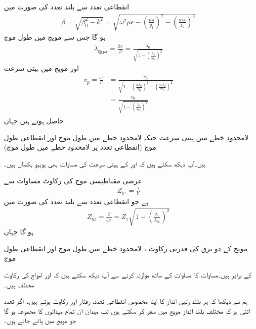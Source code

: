 انقطاعی تعدد سے بلند تعدد  کی صورت میں
\begin{align}
\beta=\sqrt{\beta_0^2-k^2}=\sqrt{\omega^2 \mu \epsilon-\left(\frac{n\pi}{y_1}\right)^2-\left(\frac{m\pi}{z_1}\right)^2}
\end{align}
ہو گا جس سے مویج میں طول موج
\begin{align}
\lambda_{\text{مویج}}=\frac{2\pi}{\beta}=\frac{\lambda_0}{\sqrt{1-\left(\frac{\lambda_0}{\lambda_{0c}}\right)^2}}
\end{align}
اور مویج میں  ہیتی سرعت
\begin{gather}
\begin{aligned}
v_p=\frac{\omega}{\beta}&=\frac{v_0}{\sqrt{1-\left(\frac{n\lambda_0}{2y_1}\right)^2-\left(\frac{m\lambda_0}{2z_1}\right)^2}}\\
&=\frac{v_0}{\sqrt{1-\left(\frac{\lambda_0}{\lambda_{0c}}\right)^2}}
\end{aligned}
\end{gather}
حاصل ہوتے ہیں جہاں
\begin{description}
 لامحدود خطے میں ہیتی سرعت  جبکہ 
 لامحدود خطے میں طول موج اور
 انقطاعی طول موج (انقطاعی تعدد پر لامحدود خطے میں طول موج)
\end{description}
ہیں۔آپ دیکھ سکتے ہیں کہ  اور  کے ہیتی سرعت کی مساوات بھی ہوبہو یکساں ہیں۔

عرضی مقناطیسی موج کی رکاوٹ مساوات  سے 
\begin{align*}
Z_{yz}=\frac{\gamma}{Y}
\end{align*}
ہے جو انقطاعی تعدد سے بلند تعدد  کی صورت میں
\begin{align}\label{مساوات_مویج_عرضی_مقناطیسی_رکاوٹ_حتمی}
Z_{yz}=\frac{\beta}{\omega \epsilon}=Z_z \sqrt{1-\left(\frac{\lambda_0}{\lambda_{0c}}\right)^2}
\end{align}
ہو گا جہاں
\begin{description}
 مویج کے ذو برق کی قدرتی رکاوٹ ، 
 لامحدود خطے میں طول موج اور
 انقطاعی طول موج
\end{description}
کے برابر ہیں۔مساوات  کا مساوات  کے ساتھ موازنہ کرنے سے آپ دیکھ سکتے ہیں کہ  اور  امواج کی رکاوٹ مختلف ہیں۔

ہم نے دیکھا کہ ہر بلند رتبی انداز کا اپنا مخصوص انقطاعی تعدد، رفتار اور رکاوٹ ہوتے ہیں۔ اگر تعدد اتنی ہو کہ مختلف بلند انداز مویج میں سفر کر سکتے ہوں تب میدان ان تمام میدانوں کا مجموعہ ہو گا جو مویج میں پائے جاتے ہوں۔ 

